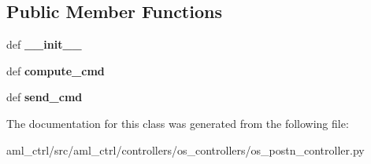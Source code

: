 \subsection*{Public Member Functions}
\begin{DoxyCompactItemize}
\item 
\hypertarget{classaml__ctrl_1_1controllers_1_1os__controllers_1_1os__postn__controller_1_1_o_s_position_controller_a4ef9b21568a648b97bcd2fbf1781055a}{def {\bfseries \-\_\-\-\_\-init\-\_\-\-\_\-}}\label{classaml__ctrl_1_1controllers_1_1os__controllers_1_1os__postn__controller_1_1_o_s_position_controller_a4ef9b21568a648b97bcd2fbf1781055a}

\item 
\hypertarget{classaml__ctrl_1_1controllers_1_1os__controllers_1_1os__postn__controller_1_1_o_s_position_controller_a2dfdbc0052a9e76beebe4f265cb6b47d}{def {\bfseries compute\-\_\-cmd}}\label{classaml__ctrl_1_1controllers_1_1os__controllers_1_1os__postn__controller_1_1_o_s_position_controller_a2dfdbc0052a9e76beebe4f265cb6b47d}

\item 
\hypertarget{classaml__ctrl_1_1controllers_1_1os__controllers_1_1os__postn__controller_1_1_o_s_position_controller_a5ab45b868042fa13b9a38e785e8b5d6b}{def {\bfseries send\-\_\-cmd}}\label{classaml__ctrl_1_1controllers_1_1os__controllers_1_1os__postn__controller_1_1_o_s_position_controller_a5ab45b868042fa13b9a38e785e8b5d6b}

\end{DoxyCompactItemize}


The documentation for this class was generated from the following file\-:\begin{DoxyCompactItemize}
\item 
aml\-\_\-ctrl/src/aml\-\_\-ctrl/controllers/os\-\_\-controllers/os\-\_\-postn\-\_\-controller.\-py\end{DoxyCompactItemize}
